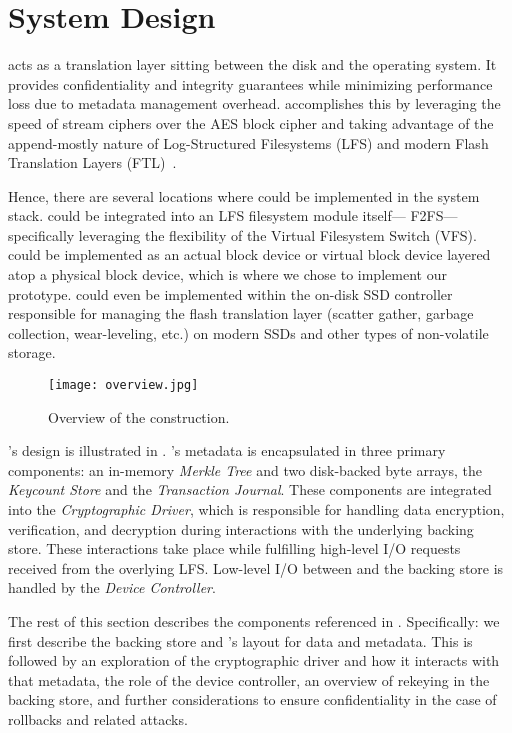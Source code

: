 \chapter{\SYSTEM{} System Design} \label{sec:design}

\SYSTEM{} acts as a translation layer sitting between the disk and the
operating system. It provides confidentiality and integrity guarantees
while minimizing performance loss due to metadata management overhead.
\SYSTEM{} accomplishes this by leveraging the speed of stream ciphers
over the AES block cipher and taking advantage of the append-mostly
nature of Log-Structured Filesystems (LFS) and modern Flash
Translation Layers (FTL)~\cite{SSD}.

Hence, there are several locations where \SYSTEM{} could be
implemented in the system stack. \SYSTEM{} could be integrated into an
LFS filesystem module itself---\eg{} F2FS---specifically leveraging
the flexibility of the Virtual Filesystem Switch (VFS). \SYSTEM{}
could be implemented as an actual block device or virtual block device
layered atop a physical block device, which is where we chose to
implement our prototype. \SYSTEM{} could even be implemented within
the on-disk SSD controller responsible for managing the flash
translation layer (scatter gather, garbage collection, wear-leveling,
etc.) on modern SSDs and other types of non-volatile storage.

\begin{figure}[ht]
 \centering
  \texttt{[image: overview.jpg]}
   \caption{Overview of the \SYSTEM{} construction.}
    \label{fig:overview}
\end{figure}

\SYSTEM{}'s design is illustrated in . \SYSTEM{}'s
metadata is encapsulated in three primary components: an in-memory
\emph{Merkle Tree} and two disk-backed byte arrays, the \emph{Keycount
  Store} and the \emph{Transaction Journal}. These components are
integrated into the \emph{Cryptographic Driver}, which is responsible
for handling data encryption, verification, and decryption during
interactions with the underlying backing store. These interactions
take place while fulfilling high-level I/O requests received from the
overlying LFS. Low-level I/O between \SYSTEM{} and the backing store
is handled by the \emph{Device Controller}.

The rest of this section describes the components referenced in
. Specifically: we first describe the backing store
and \SYSTEM{}'s layout for data and metadata. This is followed by an
exploration of the cryptographic driver and how it interacts with that
metadata, the role of the device controller, an overview of rekeying
in the backing store, and further considerations to ensure
confidentiality in the case of rollbacks and related attacks.

